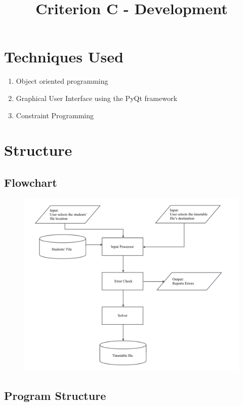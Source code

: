 \documentclass[12pt]{article}
\title{Criterion C - Development}
\author{}
\date{}
\begin{document}
\maketitle

\section{Techniques Used}

    \begin{enumerate}
        \item Object oriented programming
        \item Graphical User Interface using the PyQt framework
        \item Constraint Programming
    \end{enumerate}

\section{Structure}
    \subsection*{Flowchart}
        \begin{figure}[H]
            \centering
            \includegraphics[width=\textwidth]{system_flowchart}
        \end{figure}
    \subsection*{Program Structure}
\end{document}
